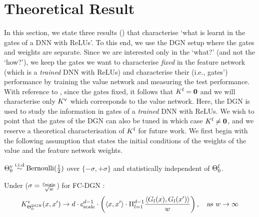 \section{Theoretical Result}\label{sec:fc}
In this section, we state three results () that characterise `what is learnt in the gates of a DNN with ReLUs'.  To this end, we use the DGN setup where the gates and weights are separate. Since we are interested only in the `what?'  (and not the `how?'), we keep the gates we want to characterise \emph{fixed} in the feature network (which is a \emph{trained} DNN with ReLUs) and characterise their (i.e., gates') performance by training the value network and measuring the test performance. With reference to , since the gates fixed, it follows that $K^{\text{f}}=\mathbf{0}$ and we will characterise only $K^{\text{v}}$ which corresponds to the value network. Here, the DGN is used to study the information in gates of a \emph{trained} DNN with ReLUs. We wish to point that the gates of the DGN can also be tuned in which case $K^{\text{f}}\neq \mathbf{0}$, and we reserve a theoretical characterisation of $K^{\text{f}}$ for future work. We first begin with the following assumption that states the initial conditions of the weights of the value and the feature network weights.
\begin{assumption}\label{assmp:main}
${\Theta}^{\text{v}}_0\stackrel{\text{i.i.d}}\sim\text{Bernoulli}(\frac12)$ over $\{-{\sigma},+{\sigma}\}$ and statistically independent of $\Theta^{\textrm{f}}_0$.
\end{assumption}
\begin{theorem}\label{th:main} Under   ($\sigma=\frac{c_{\text{scale}}}{\sqrt{w}}$) for FC-DGN : 
\begin{align*}
K^{\text{v}}_{\Theta^{\text{DGN}}_0}(x,x') \rightarrow d\cdot c_{\text{scale}}^{d-1} \cdot \left(\langle  x,x'\rangle \cdot \Pi_{l=1}^{d-1} \frac{\langle G_l(x),G_l(x')\rangle}w\right), \quad\text{as}\,\, w\rightarrow\infty 
\end{align*}
\end{theorem}
